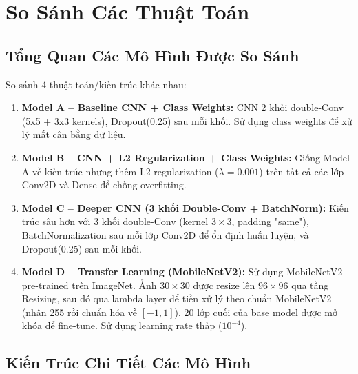 \documentclass[12pt,a4paper]{article}
\begin{document}
\section{So Sánh Các Thuật Toán}

\subsection{Tổng Quan Các Mô Hình Được So Sánh}
So sánh 4 thuật toán/kiến trúc khác nhau:

\begin{enumerate}[leftmargin=*]
    \item \textbf{Model A -- Baseline CNN + Class Weights:} CNN 2 khối double-Conv (5x5 + 3x3 kernels), Dropout(0.25) sau mỗi khối. Sử dụng class weights để xử lý mất cân bằng dữ liệu.
    \item \textbf{Model B -- CNN + L2 Regularization + Class Weights:} Giống Model A về kiến trúc nhưng thêm L2 regularization ($\lambda=0.001$) trên tất cả các lớp Conv2D và Dense để chống overfitting.
    \item \textbf{Model C -- Deeper CNN (3 khối Double-Conv + BatchNorm):} Kiến trúc sâu hơn với 3 khối double-Conv (kernel $3\times3$, padding "same"), BatchNormalization sau mỗi lớp Conv2D để ổn định huấn luyện, và Dropout(0.25) sau mỗi khối.
    \item \textbf{Model D -- Transfer Learning (MobileNetV2):} Sử dụng MobileNetV2 pre-trained trên ImageNet. Ảnh $30\times30$ được resize lên $96\times96$ qua tầng Resizing, sau đó qua lambda layer để tiền xử lý theo chuẩn MobileNetV2 (nhân 255 rồi chuẩn hóa về $[-1, 1]$). 20 lớp cuối của base model được mở khóa để fine-tune. Sử dụng learning rate thấp ($10^{-4}$).
\end{enumerate}

\subsection{Kiến Trúc Chi Tiết Các Mô Hình}
\end{document}
